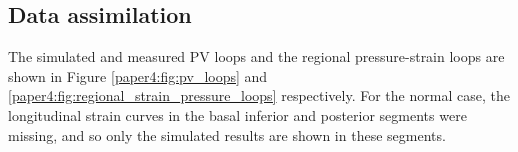 

\subsection{Data assimilation}

The simulated and measured PV loops and the regional
pressure-strain loops are shown in Figure \ref{paper4:fig:pv_loops} and
\ref{paper4:fig:regional_strain_pressure_loops} respectively. 
For the normal case, the longitudinal strain curves in the basal
inferior and posterior segments were missing, and so only the
simulated results are shown in these segments.

